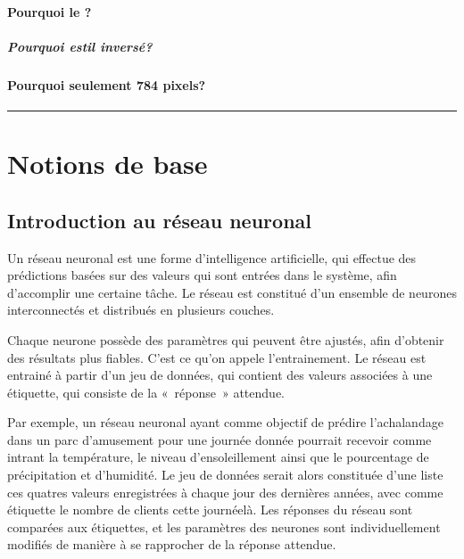 \documentclass[letterpaper,10pt,french]{sphinxmanual}
\begin{document}
\paragraph{Pourquoi le ?}
\label{\detokenize{preprocessing:pourquoi-le-grayscale}}

\subparagraph{Pourquoi est\sphinxhyphen{}il inversé?}
\label{\detokenize{preprocessing:pourquoi-est-il-inverse}}

\paragraph{Pourquoi seulement 784 pixels?}
\label{\detokenize{preprocessing:pourquoi-seulement-784-pixels}}

\bigskip\hrule\bigskip



\section{Notions de base}
\label{\detokenize{notions_de_base:notions-de-base}}\label{\detokenize{notions_de_base::doc}}

\subsection{Introduction au réseau neuronal}
\label{\detokenize{notions_de_base:introduction-au-reseau-neuronal}}
Un réseau neuronal est une forme d’intelligence artificielle, qui effectue des prédictions basées sur des valeurs qui sont entrées dans le système,
afin d’accomplir une certaine tâche. Le réseau est constitué d’un ensemble de neurones interconnectés et distribués en plusieurs couches.

Chaque neurone possède des paramètres qui peuvent être ajustés, afin d’obtenir des résultats plus fiables. C’est ce qu’on appele l’entrainement.
Le réseau est entrainé à partir d’un jeu de données, qui contient des valeurs associées à une étiquette, qui consiste de la « réponse » attendue.

Par exemple, un réseau neuronal ayant comme objectif de prédire l’achalandage dans un parc d’amusement pour une journée donnée pourrait recevoir
comme intrant la température, le niveau d’ensoleillement ainsi que le pourcentage de précipitation et d’humidité. Le jeu de données serait alors
constituée d’une liste ces quatres valeurs enregistrées à chaque jour des dernières années, avec comme étiquette le nombre de clients cette journée\sphinxhyphen{}là.
Les réponses du réseau sont comparées aux étiquettes, et les paramètres des neurones sont individuellement modifiés de manière à se rapprocher de la réponse attendue.
\end{document}
